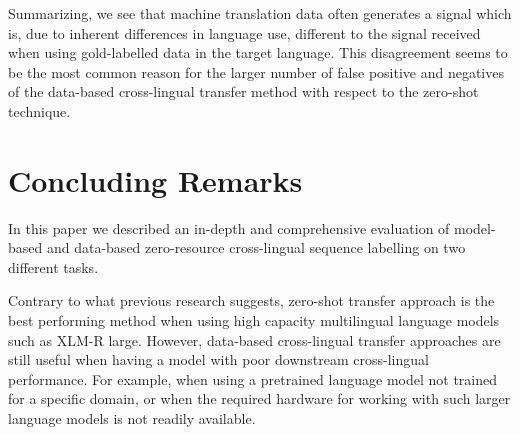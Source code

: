 \documentclass[11pt]{article}
\begin{document}
\begin{table}[tbp]
    \centering
    \small
{}

    \caption{Number of times words appear as target words in the train datasets}
    \label{tab:WordNoDataset}
\end{table}







Summarizing, we see that machine translation data often generates a signal which is, due to inherent differences in language use, different to the signal received when using gold-labelled data in the target language. This disagreement seems to be the most common reason for the larger number of false positive and negatives of the data-based cross-lingual transfer method with respect to the zero-shot technique.






\section{Concluding Remarks}
\label{sec:Conclusions}

In this paper we described an in-depth and comprehensive evaluation of model-based and data-based zero-resource cross-lingual sequence labelling on two different tasks. 

Contrary to what previous research suggests, zero-shot transfer approach is the best performing method when using high capacity multilingual language models such as XLM-R large. However, data-based cross-lingual transfer approaches are still useful when having a model with poor downstream cross-lingual performance. For example, when using a pretrained language model not trained for a specific domain, or when the required hardware for working with such larger language models is not readily available. 
\end{document}
